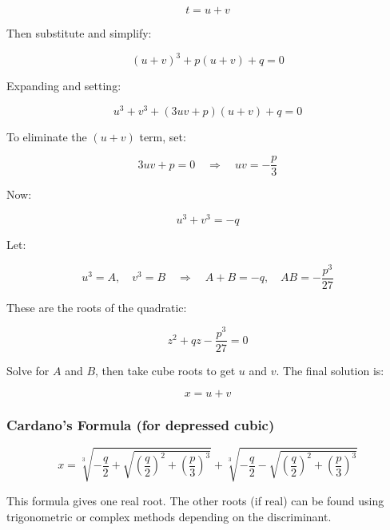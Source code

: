 \[
    t = u + v
\]

Then substitute and simplify:

\[
    {(u+v)}^3 + p(u+v) + q = 0
\]

Expanding and setting:

\[
    u^3 + v^3 + (3uv + p)(u+v) + q = 0
\]

To eliminate the \((u+v)\) term, set:

\[
    3uv + p = 0 \quad \Rightarrow \quad uv = -\frac{p}{3}
\]

Now:

\[
    u^3 + v^3 = -q
\]

Let:

\[
    u^3 = A, \quad v^3 = B \quad \Rightarrow \quad A + B = -q, \quad AB = -\frac{p^3}{27}
\]

These are the roots of the quadratic:

\[
    z^2 + qz - \frac{p^3}{27} = 0
\]

Solve for \(A\) and \(B\), then take cube roots to get \(u\) and \(v\). The final solution is:

\[
    x = u + v
\]

\subsubsection{Cardano’s Formula (for depressed cubic)}

\[
    x = \sqrt[3]{-\frac{q}{2} + \sqrt{{\left(\frac{q}{2}\right)}^2 + {\left(\frac{p}{3}\right)}^3}} + 
    \sqrt[3]{-\frac{q}{2} - \sqrt{{\left(\frac{q}{2}\right)}^2 + {\left(\frac{p}{3}\right)}^3}}
\]

This formula gives one real root. The other roots (if real) can be found using trigonometric or complex 
methods depending on the discriminant.

